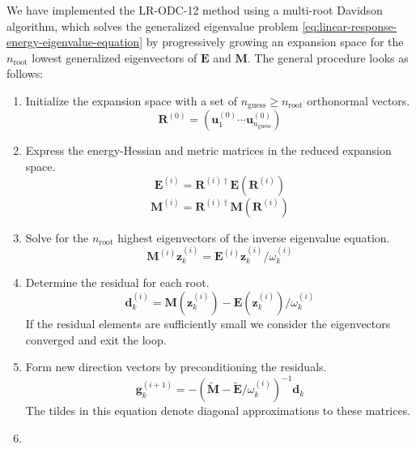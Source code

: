 We have implemented the LR-ODC-12 method using a multi-root Davidson algorithm,
which solves the generalized eigenvalue problem
\eqref{eq:linear-response-energy-eigenvalue-equation} by progressively growing
an expansion space for the \(n_\mathrm{root}\) lowest generalized eigenvectors
of \(\mathbf{E}\) and \(\mathbf{M}\). The general procedure looks as follows:
\begin{enumerate}
    \item
        \label{item:davidson-initialization}
        Initialize the expansion space with a set of \(n_\mathrm{guess}\geq
        n_\mathrm{root}\) orthonormal vectors.
        \[
            \mathbf{R}^{(0)}
            =
            (
                \mathbf{u}_1^{(0)}
                \cdots
                \mathbf{u}_{n_\mathrm{guess}}^{(0)}
            )
        \]
    \item
        \label{item:davidson-step-one}
        Express the energy-Hessian and metric matrices in the reduced expansion
        space.
        \[
            \mathbf{E}^{(i)}
            =
            \mathbf{R}^{(i)\dagger}
            \mathbf{E}(\mathbf{R}^{(i)})
        \]
        \[
            \mathbf{M}^{(i)}
            =
            \mathbf{R}^{(i)\dagger}
            \mathbf{M}(\mathbf{R}^{(i)})
        \]
    \item
        Solve for the \(n_\mathrm{root}\) highest eigenvectors of the
        inverse eigenvalue equation.
        \[
            \mathbf{M}^{(i)}
            \mathbf{z}_k^{(i)}
            =
            \mathbf{E}^{(i)}
            \mathbf{z}_k^{(i)}/
            \omega_k^{(i)}
        \]
    \item
        Determine the residual for each root.
        \[
            \mathbf{d}_k^{(i)}
            =
            \mathbf{M}(\mathbf{z}_k^{(i)})
            -
            \mathbf{E}(\mathbf{z}_k^{(i)})/
            \omega_k^{(i)}
        \]
        If the residual elements are sufficiently small we consider the
        eigenvectors converged and exit the loop.
    \item
        \label{item:davidson-step-three}
        Form new direction vectors by preconditioning the residuals.
        \[
            \mathbf{g}_k^{(i+1)}
            =
            -
            (
                \tilde{\mathbf{M}}
                -
                \tilde{\mathbf{E}}/
                \omega_k^{(i)}
            )^{-1}
            \mathbf{d}_k
        \]
        The tildes in this equation denote diagonal approximations to these
        matrices.
    \item

\end{enumerate}

